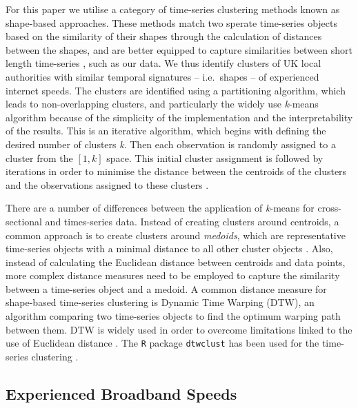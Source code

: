 \documentclass[Royal,times,sageh]{sagej}
\begin{document}
For this paper we utilise a category of time-series clustering methods
known as shape-based approaches. These methods match two sperate
time-series objects based on the similarity of their shapes through the
calculation of distances between the shapes, and are better equipped to
capture similarities between short length time-series
\citep{aghabozorgi2015time}, such as our data. We thus identify clusters
of UK local authorities with similar temporal signatures -- i.e.~shapes
-- of experienced internet speeds. The clusters are identified using a
partitioning algorithm, which leads to non-overlapping clusters, and
particularly the widely use \emph{k}-means algorithm because of the
simplicity of the implementation and the interpretability of the
results. This is an iterative algorithm, which begins with defining the
desired number of clusters \emph{k}. Then each observation is randomly
assigned to a cluster from the \([1,k]\) space. This initial cluster
assignment is followed by iterations in order to minimise the distance
between the centroids of the clusters and the observations assigned to
these clusters \citep{james2013introduction}.

There are a number of differences between the application of
\emph{k}-means for cross-sectional and times-series data. Instead of
creating clusters around centroids, a common approach is to create
clusters around \emph{medoids}, which are representative time-series
objects with a minimal distance to all other cluster objects
\citep{sardatime}. Also, instead of calculating the Euclidean distance
between centroids and data points, more complex distance measures need
to be employed to capture the similarity between a time-series object
and a medoid. A common distance measure for shape-based time-series
clustering is Dynamic Time Warping (DTW), an algorithm comparing two
time-series objects to find the optimum warping path between them. DTW
is widely used in order to overcome limitations linked to the use of
Euclidean distance
\citep{sardatime, berndt1994using, ratanamahatana2004everything}. The
\texttt{R} package \texttt{dtwclust} has been used for the time-series
clustering \citep{dtwclust}.

\hypertarget{sec:3.2}{%
\subsection{Experienced Broadband Speeds}\label{sec:3.2}}
\end{document}
